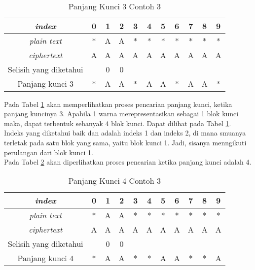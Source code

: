 	\\	
	\begin{table}[H]
	 	\centering
	 	\caption{Panjang Kunci 3 Contoh 3}
	 	\setlength{\arrayrulewidth}{.08em}
	 	\begin{tabular}{|c|c|c|c|c|c|c|c|c|c|c|}\hline
	 	\textit{index}&0&1&2&3&4&5&6&7&8&9\\ \hline
	 	\textit{plain text}&\cellcolor{blue!15}*&\cellcolor{blue!15}A&\cellcolor{blue!15}A&\cellcolor{blue!15}*&\cellcolor{green!15}*&\cellcolor{green!15}*&\cellcolor{green!15}*&\cellcolor{green!15}*&\cellcolor{violet!30}*&\cellcolor{violet!30}*\\ \hline
	 	\textit{ciphertext}&\cellcolor{blue!15}A&\cellcolor{blue!15}A&\cellcolor{blue!15}A&\cellcolor{blue!15}A&\cellcolor{green!15}A&\cellcolor{green!15}A&\cellcolor{green!15}A&\cellcolor{green!15}A&\cellcolor{violet!30}A&\cellcolor{violet!30}A\\ \hline
		Selisih yang diketahui & &0&0& & & & & & & \\ \hline	
		Panjang kunci 3 &*&A&A&*&A&A&*&A&A&*\\ \hline 	
	 	\end{tabular}
	 	\label{tab:k3contoh3}
	\end{table}
	Pada Tabel \ref{tab:k3contoh3} akan memperlihatkan proses pencarian panjang kunci, ketika panjang kuncinya 3. Apabila 1 warna merepresentasikan sebagai 1 blok kunci maka, dapat terbentuk sebanyak 4 blok kunci. Dapat dilihat pada Tabel \ref{tab:k3contoh3}. Indeks yang diketahui baik \plaintext dan \ciphertext adalah indeks 1 dan indeks 2, di mana smuanya terletak pada satu blok yang sama, yaitu blok kunci 1. Jadi, sisanya menngikuti perulangan dari blok kunci 1. 
	\\
	Pada Tabel \ref{tab:k4contoh3} akan diperlihatkan proses pencarian ketika panjang kunci adalah 4.
	\begin{table}[H]
	 	\centering
	 	\caption{Panjang Kunci 4 Contoh 3}
	 	\setlength{\arrayrulewidth}{.08em}
	 	\begin{tabular}{|c|c|c|c|c|c|c|c|c|c|c|}\hline
	 	\textit{index}&0&1&2&3&4&5&6&7&8&9\\ \hline
	 	\textit{plain text}&\cellcolor{blue!15}*&\cellcolor{blue!15}A&\cellcolor{blue!15}A&\cellcolor{green!15}*&\cellcolor{green!15}*&\cellcolor{green!15}*&\cellcolor{violet!30}*&\cellcolor{violet!30}*&\cellcolor{violet!30}*&\cellcolor{purple!25}*\\ \hline
	 	\textit{ciphertext}&\cellcolor{blue!15}A&\cellcolor{blue!15}A&\cellcolor{blue!15}A&\cellcolor{green!15}A&\cellcolor{green!15}A&\cellcolor{green!15}A&\cellcolor{violet!30}A&\cellcolor{violet!30}A&\cellcolor{violet!30}A&\cellcolor{purple!25}A\\ \hline
		Selisih yang diketahui & &0&0& & & & & & & \\ \hline	
		Panjang kunci 4 &*&A&A&*&*&A&A&*&*&A\\ \hline 	
	 	\end{tabular}
	 	\label{tab:k4contoh3}
	\end{table}
